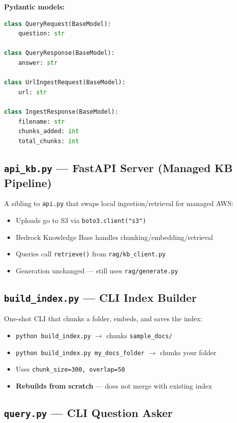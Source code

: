 \documentclass[11pt,a4paper]{paper}
\begin{document}
\textbf{Pydantic models:}

\begin{lstlisting}[language=Python, style=pythonstyle, caption={Pydantic request/response models.}, label=lst:pydantic]
class QueryRequest(BaseModel):
    question: str

class QueryResponse(BaseModel):
    answer: str

class UrlIngestRequest(BaseModel):
    url: str

class IngestResponse(BaseModel):
    filename: str
    chunks_added: int
    total_chunks: int
\end{lstlisting}

\subsection{\texttt{api\_kb.py} — FastAPI Server (Managed KB Pipeline)}

A sibling to \texttt{api.py} that swaps local ingestion/retrieval for managed AWS:
\begin{itemize}
  \item Uploads go to S3 via \texttt{boto3.client("s3")}
  \item Bedrock Knowledge Base handles chunking/embedding/retrieval
  \item Queries call \texttt{retrieve()} from \texttt{rag/kb\_client.py}
  \item Generation unchanged — still uses \texttt{rag/generate.py}
\end{itemize}

\subsection{\texttt{build\_index.py} — CLI Index Builder}

One-shot CLI that chunks a folder, embeds, and saves the index:
\begin{itemize}
  \item \texttt{python build\_index.py} $\rightarrow$ chunks \texttt{sample\_docs/}
  \item \texttt{python build\_index.py my\_docs\_folder} $\rightarrow$ chunks your folder
  \item Uses \texttt{chunk\_size=300, overlap=50}
  \item \textbf{Rebuilds from scratch} — does not merge with existing index
\end{itemize}

\subsection{\texttt{query.py} — CLI Question Asker}
\end{document}
